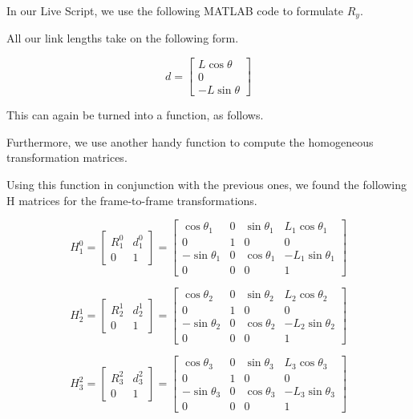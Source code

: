 \documentclass[conference]{IEEEtran}
\begin{document}
In our Live Script, we use the following MATLAB code to formulate $R_y$.


All our link lengths take on the following form.

\begin{equation*}
    d = \begin{bmatrix}
        L \cos\theta\\0\\-L\sin\theta
    \end{bmatrix}
\end{equation*}

This can again be turned into a function, as follows.


Furthermore, we use another handy function to compute the homogeneous
transformation matrices.


Using this function in conjunction with the previous ones,
we found the following H matrices for the frame-to-frame transformations.

\[
    H^0_1 = \begin{bmatrix}
        R^0_1 & d^0_1\\
        0 & 1
    \end{bmatrix}
    =
    \begin{bmatrix}
        \cos\theta _{1} & 0 & \sin\theta _{1} & L_{1} \cos\theta_1\\
        0 & 1 & 0 & 0\\
        -\sin\theta _{1} & 0 & \cos\theta_{1} & -L_1 \sin\theta_1\\
        0 & 0 & 0 & 1
    \end{bmatrix}
\]

\[
    H^1_2 = \begin{bmatrix}
        R^1_2 & d^1_2\\
        0 & 1
    \end{bmatrix}
    =
    \begin{bmatrix}
        \cos\theta _{2} & 0 & \sin\theta _{2} & L_{2} \cos\theta_2\\
        0 & 1 & 0 & 0\\
        -\sin\theta _{2} & 0 & \cos\theta_{2} & -L_2 \sin\theta_2\\
        0 & 0 & 0 & 1
    \end{bmatrix}
\]

\[
    H^2_3 = \begin{bmatrix}
        R^2_3 & d^2_3\\
        0 & 1
    \end{bmatrix}
    =
    \begin{bmatrix}
        \cos\theta _{3} & 0 & \sin\theta _{3} & L_{3} \cos\theta_3\\
        0 & 1 & 0 & 0\\
        -\sin\theta _{3} & 0 & \cos\theta_{3} & -L_3 \sin\theta_3\\
        0 & 0 & 0 & 1
    \end{bmatrix}
\]
\end{document}
